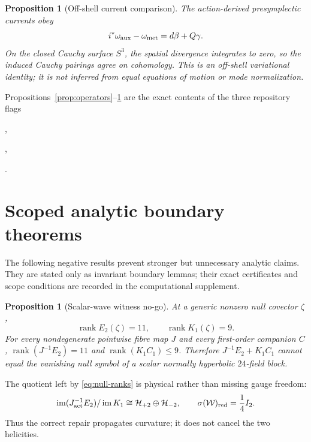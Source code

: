 \documentclass[11pt]{article}
\newtheorem{proposition}[theorem]{Proposition}
\theoremstyle{definition}
\theoremstyle{remark}
\newcommand{\W}{\mathcal W}
\newcommand{\cH}{\mathcal H}
\newcommand{\im}{\operatorname{im}}
\newcommand{\rank}{\operatorname{rank}}
\begin{document}
\begin{proposition}[Off-shell current comparison]\label{prop:aux-current}
The action-derived presymplectic currents obey
\begin{equation}\label{eq:aux-current}
 i^*\omega_{\rm aux}-\omega_{\rm met}=d\beta+Q\gamma.
\end{equation}
On the closed Cauchy surface $S^3$, the spatial divergence integrates to
zero, so the induced Cauchy pairings agree on cohomology.  This is an
off-shell variational identity; it is not inferred from equal equations of
motion or mode normalization.
\end{proposition}

Propositions~\ref{prop:operators}--\ref{prop:aux-current} are the exact
contents of the three repository flags
\begin{center}\small
{},\par
{},\par
{}.
\end{center}

\section{Scoped analytic boundary theorems}\label{sec:nogo}

The following negative results prevent stronger but unnecessary analytic
claims.  They are stated only as invariant boundary lemmas; their exact
certificates and scope conditions are recorded in the computational
supplement.

\begin{proposition}[Scalar-wave witness no-go]\label{prop:scalar-no-go}
At a generic nonzero null covector $\zeta$,
\begin{equation}\label{eq:null-ranks}
 \rank E_2(\zeta)=11,
 \qquad \rank K_1(\zeta)=9.
\end{equation}
For every nondegenerate pointwise fibre map $J$ and every first-order
companion $C$,
$\rank(J^{-1}E_2)=11$ and $\rank(K_1C_1)\leq9$.  Therefore
$J^{-1}E_2+K_1C_1$ cannot equal the vanishing null symbol of a scalar normally
hyperbolic $24$-field block.
\end{proposition}

The quotient left by \eqref{eq:null-ranks} is physical rather than missing
gauge freedom:
\begin{equation}\label{eq:helicity-quotient}
 \im(J_{\rm act}^{-1}E_2)/\im K_1
 \cong\cH_{+2}\oplus\cH_{-2},
 \qquad
 \sigma(\W)_{\rm red}=\frac14 I_2.
\end{equation}
Thus the correct repair propagates curvature; it does not cancel the two
helicities.
\end{document}
